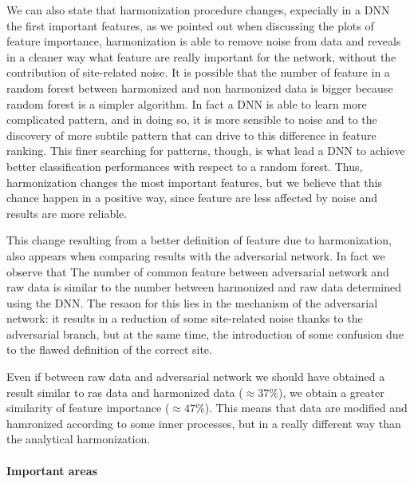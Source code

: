 \documentclass[11pt]{report}
\begin{document}
We can also state that harmonization procedure changes, expecially in a DNN the first important features, as we pointed out when discussing the plots of feature importance, harmonization is able to remove noise from data and reveals in a cleaner way what feature are really important for the network, without the contribution of site-related noise.
It is possible that the number of feature in a random forest between harmonized and non harmonized data is bigger because random forest is a simpler algorithm.
In fact a DNN is able to learn more complicated pattern, and in doing so, it is more sensible to noise and to the discovery of more subtile pattern that can drive to this difference in feature ranking.
This finer searching for patterns, though, is what lead a DNN to achieve better classification performances with respect to a random forest.
Thus, harmonization changes the most important features, but we believe that this chance happen in a positive way, since feature are less affected by noise and results are more reliable.

This change resulting from a better definition of feature due to harmonization, also appears when comparing results with the adversarial network.
In fact we observe that
The number of common feature between adversarial network and raw data is similar to the number between harmonized and raw data determined using the DNN.
The resaon for this lies in the mechanism of the adversarial network: it results in a reduction of some site-related noise thanks to the adversarial branch, but at the same time, the introduction of some confusion due to the flawed definition of the correct site.

Even if between raw data and adversarial network we should have obtained a result similar to ras data and harmonized data ($\approx 37\%$), we obtain a greater similarity of feature importance ($\approx 47\%$).
This means that data are modified and hamronized according to some inner processes, but in a really different way than the analytical harmonization.

\paragraph{Important areas} \hfill

\newpage

\end{document}
